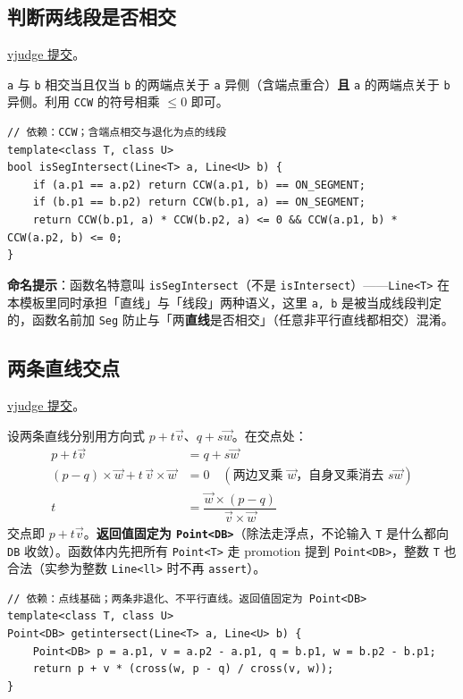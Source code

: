 		\subsection{判断两线段是否相交}

		\href{https://vjudge.net/solution/64175810}{vjudge 提交}。

		\texttt{a} 与 \texttt{b} 相交当且仅当 \texttt{b} 的两端点关于 \texttt{a} 异侧（含端点重合）\textbf{且} \texttt{a} 的两端点关于 \texttt{b} 异侧。利用 \texttt{CCW} 的符号相乘 $\le 0$ 即可。

\begin{verbatim}
// 依赖：CCW；含端点相交与退化为点的线段
template<class T, class U>
bool isSegIntersect(Line<T> a, Line<U> b) {
	if (a.p1 == a.p2) return CCW(a.p1, b) == ON_SEGMENT;
	if (b.p1 == b.p2) return CCW(b.p1, a) == ON_SEGMENT;
	return CCW(b.p1, a) * CCW(b.p2, a) <= 0 && CCW(a.p1, b) * CCW(a.p2, b) <= 0;
}
\end{verbatim}

		\textbf{命名提示}：函数名特意叫 \texttt{isSegIntersect}（不是 \texttt{isIntersect}）——\texttt{Line<T>} 在本模板里同时承担「直线」与「线段」两种语义，这里 \texttt{a, b} 是被当成线段判定的，函数名前加 \texttt{Seg} 防止与「两\textbf{直线}是否相交」（任意非平行直线都相交）混淆。

		\subsection{两条直线交点}

		\href{https://vjudge.net/solution/64186810}{vjudge 提交}。

		设两条直线分别用方向式 $p + t\vec{v}$、$q + s\vec{w}$。在交点处：
		\begin{align*}
			p + t\vec{v} &= q + s\vec{w} \\
			(p - q) \times \vec{w} + t\, \vec{v} \times \vec{w} &= 0 \quad (\text{两边叉乘 } \vec{w}\text{，自身叉乘消去 } s\vec{w}) \\
			t &= \dfrac{\vec{w} \times (p - q)}{\vec{v} \times \vec{w}}
		\end{align*}
		交点即 $p + t\vec{v}$。\textbf{返回值固定为 \texttt{Point<DB>}}（除法走浮点，不论输入 \texttt{T} 是什么都向 \texttt{DB} 收敛）。函数体内先把所有 \texttt{Point<T>} 走 promotion 提到 \texttt{Point<DB>}，整数 \texttt{T} 也合法（实参为整数 \texttt{Line<ll>} 时不再 \texttt{assert}）。

\begin{verbatim}
// 依赖：点线基础；两条非退化、不平行直线。返回值固定为 Point<DB>
template<class T, class U>
Point<DB> getintersect(Line<T> a, Line<U> b) {
	Point<DB> p = a.p1, v = a.p2 - a.p1, q = b.p1, w = b.p2 - b.p1;
	return p + v * (cross(w, p - q) / cross(v, w));
}
\end{verbatim}

